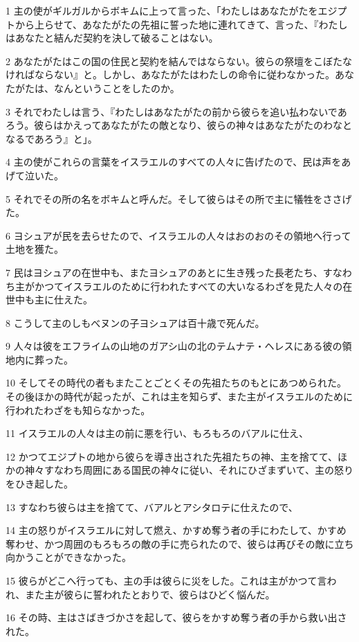 \par 1 主の使がギルガルからボキムに上って言った、「わたしはあなたがたをエジプトから上らせて、あなたがたの先祖に誓った地に連れてきて、言った、『わたしはあなたと結んだ契約を決して破ることはない。
\par 2 あなたがたはこの国の住民と契約を結んではならない。彼らの祭壇をこぼたなければならない』と。しかし、あなたがたはわたしの命令に従わなかった。あなたがたは、なんということをしたのか。
\par 3 それでわたしは言う、『わたしはあなたがたの前から彼らを追い払わないであろう。彼らはかえってあなたがたの敵となり、彼らの神々はあなたがたのわなとなるであろう』と」。
\par 4 主の使がこれらの言葉をイスラエルのすべての人々に告げたので、民は声をあげて泣いた。
\par 5 それでその所の名をボキムと呼んだ。そして彼らはその所で主に犠牲をささげた。
\par 6 ヨシュアが民を去らせたので、イスラエルの人々はおのおのその領地へ行って土地を獲た。
\par 7 民はヨシュアの在世中も、またヨシュアのあとに生き残った長老たち、すなわち主がかつてイスラエルのために行われたすべての大いなるわざを見た人々の在世中も主に仕えた。
\par 8 こうして主のしもべヌンの子ヨシュアは百十歳で死んだ。
\par 9 人々は彼をエフライムの山地のガアシ山の北のテムナテ・ヘレスにある彼の領地内に葬った。
\par 10 そしてその時代の者もまたことごとくその先祖たちのもとにあつめられた。その後ほかの時代が起ったが、これは主を知らず、また主がイスラエルのために行われたわざをも知らなかった。
\par 11 イスラエルの人々は主の前に悪を行い、もろもろのバアルに仕え、
\par 12 かつてエジプトの地から彼らを導き出された先祖たちの神、主を捨てて、ほかの神々すなわち周囲にある国民の神々に従い、それにひざまずいて、主の怒りをひき起した。
\par 13 すなわち彼らは主を捨てて、バアルとアシタロテに仕えたので、
\par 14 主の怒りがイスラエルに対して燃え、かすめ奪う者の手にわたして、かすめ奪わせ、かつ周囲のもろもろの敵の手に売られたので、彼らは再びその敵に立ち向かうことができなかった。
\par 15 彼らがどこへ行っても、主の手は彼らに災をした。これは主がかつて言われ、また主が彼らに誓われたとおりで、彼らはひどく悩んだ。
\par 16 その時、主はさばきづかさを起して、彼らをかすめ奪う者の手から救い出された。
